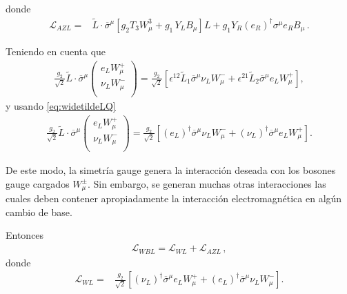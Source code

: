 \begin{frame}
donde
\begin{align}
\label{eq:lazl}
  \mathcal{L}_{A Z L}=& \widetilde{L}\cdot\overline{\sigma}^\mu\left[g_2 T_3W_\mu^3+{g_1}\,Y_LB_\mu\right]L+ {g_1} Y_R\left(e_R \right)^{\dagger}\sigma^\mu  {e_R} B_\mu\,.
\end{align}

Teniendo en cuenta que 
\begin{align}
  \frac{g_2}{\sqrt{2}}\widetilde{L}\cdot\overline{\sigma}^\mu
  \begin{pmatrix}
e_LW_\mu^+\\
\nu_L W_\mu^-\\    
  \end{pmatrix}=\frac{g_2}{\sqrt{2}} \left[ \epsilon^{12} \widetilde{L}_1 \overline{\sigma}^{\mu} \nu_L W_{\mu}^-
+\epsilon^{21}  \widetilde{L}_2 \overline{\sigma}^{\mu} e_L W_{\mu}^+ \right],
\end{align}
y usando \eqref{eq:widetildeLQ}
\begin{align}
  \frac{g_2}{\sqrt{2}}\widetilde{L}\cdot\overline{\sigma}^\mu
  \begin{pmatrix}
e_LW_\mu^+\\
\nu_L W_\mu^-\\    
  \end{pmatrix}=\frac{g_2}{\sqrt{2}} \left[\left( e_L \right)^{\dagger} \overline{\sigma}^{\mu} \nu_L W_{\mu}^-
+ \left( \nu_L \right)^{\dagger} \overline{\sigma}^{\mu} e_L W_{\mu}^+ \right].
\end{align}
\end{frame}
De este modo, la simetría gauge genera la interacción deseada con los bosones gauge cargados $W_{\mu}^{\pm}$. Sin embargo, se generan muchas otras interacciones las cuales deben contener apropiadamente la interacción electromagnética en algún cambio de base.

Entonces
\begin{align}
  \mathcal{L}_{WBL}= \mathcal{L}_{W L}+  \mathcal{L}_{A Z L}\,,
\end{align}
donde
\begin{align}
\label{eq:lwl}
  \mathcal{L}_{W L}=&\frac{g_2}{\sqrt{2}}\left[\left( \nu_L \right)^{\dagger}\overline{\sigma}^\mu e_LW_\mu^++
\left( e_L \right)^{\dagger}\overline{\sigma}^\mu\nu_L W_\mu^-\right].
\end{align}

